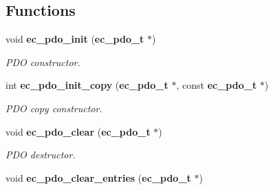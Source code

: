 \subsection*{\-Functions}
\begin{DoxyCompactItemize}
\item 
void {\bf ec\-\_\-pdo\-\_\-init} ({\bf ec\-\_\-pdo\-\_\-t} $\ast$)\label{pdo_8h_afa7a6b78374dc77781dbf9bae1b3dbca}

\begin{DoxyCompactList}\small\item\em \-P\-D\-O constructor. \end{DoxyCompactList}\item 
int {\bf ec\-\_\-pdo\-\_\-init\-\_\-copy} ({\bf ec\-\_\-pdo\-\_\-t} $\ast$, const {\bf ec\-\_\-pdo\-\_\-t} $\ast$)
\begin{DoxyCompactList}\small\item\em \-P\-D\-O copy constructor. \end{DoxyCompactList}\item 
void {\bf ec\-\_\-pdo\-\_\-clear} ({\bf ec\-\_\-pdo\-\_\-t} $\ast$)\label{pdo_8h_a51588a6c044259c2db97a2be97eabfd9}

\begin{DoxyCompactList}\small\item\em \-P\-D\-O destructor. \end{DoxyCompactList}\item 
void {\bf ec\-\_\-pdo\-\_\-clear\-\_\-entries} ({\bf ec\-\_\-pdo\-\_\-t} $\ast$)\label{pdo_8h_a9264d3cb9d741ea6b72f5a3e9be382e4}


\end{DoxyCompactItemize}
